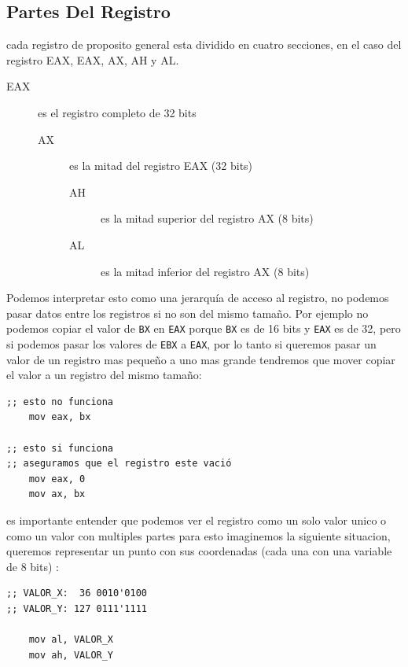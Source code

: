\documentclass[12pt]{article}
\begin{document}
\subsection*{Partes Del Registro}
\label{sec:org4d957f3}
cada registro de proposito general esta dividido en cuatro secciones, en el caso del registro EAX, EAX, AX, AH y AL.

\begin{description}
\item[{EAX}] es el registro completo de 32 bits
\begin{description}
\item[{AX}] es la mitad del registro EAX (32 bits)
\begin{description}
\item[{AH}] es la mitad superior del registro AX (8 bits)
\item[{AL}] es la mitad inferior del registro AX (8 bits)
\end{description}
\end{description}
\end{description}

Podemos interpretar esto como una jerarquía de acceso al registro, no podemos pasar datos entre los registros si no son del mismo tamaño. Por ejemplo no podemos copiar el valor de \texttt{BX} en \texttt{EAX} porque \texttt{BX} es de 16 bits y \texttt{EAX} es de 32, pero si podemos pasar los valores de \texttt{EBX} a \texttt{EAX}, por lo tanto si queremos pasar un valor de un registro mas pequeño a uno mas grande tendremos que mover copiar el valor a un registro del mismo tamaño: 

\lstset{language=nasm,label= ,caption= ,captionpos=b,numbers=none,style=mystyle}
\begin{lstlisting}
;; esto no funciona
    mov eax, bx            

;; esto si funciona
;; aseguramos que el registro este vació 
    mov eax, 0               
    mov ax, bx
\end{lstlisting}

es importante entender que podemos ver el registro como un solo valor unico o como un valor con multiples partes para esto imaginemos la siguiente situacion, queremos representar un punto con sus coordenadas (cada una con una variable de 8 bits) : 

\lstset{language=nasm,label= ,caption= ,captionpos=b,numbers=none,style=mystyle}
\begin{lstlisting}
;; VALOR_X:  36 0010'0100
;; VALOR_Y: 127 0111'1111

    mov al, VALOR_X
    mov ah, VALOR_Y
\end{lstlisting}
\end{document}
